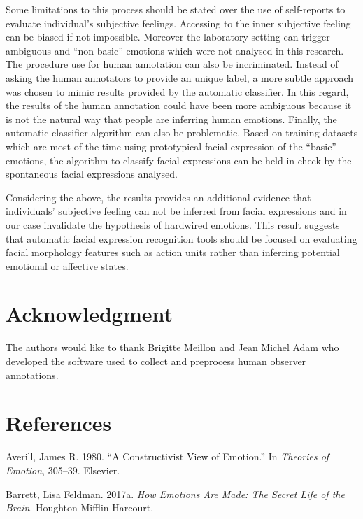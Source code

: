 \documentclass[conference,final,]{IEEEtran}
\begin{document}
Some limitations to this process should be stated over the use of
self-reports to evaluate individual's subjective feelings. Accessing to
the inner subjective feeling can be biased if not impossible. Moreover
the laboratory setting can trigger ambiguous and ``non-basic'' emotions
which were not analysed in this research. The procedure use for human
annotation can also be incriminated. Instead of asking the human
annotators to provide an unique label, a more subtle approach was chosen
to mimic results provided by the automatic classifier. In this regard,
the results of the human annotation could have been more ambiguous
because it is not the natural way that people are inferring human
emotions. Finally, the automatic classifier algorithm can also be
problematic. Based on training datasets which are most of the time using
prototypical facial expression of the ``basic'' emotions, the algorithm
to classify facial expressions can be held in check by the spontaneous
facial expressions analysed.

Considering the above, the results provides an additional evidence that
individuals' subjective feeling can not be inferred from facial
expressions and in our case invalidate the hypothesis of hardwired
emotions. This result suggests that automatic facial expression
recognition tools should be focused on evaluating facial morphology
features such as action units rather than inferring potential emotional
or affective states.

\hypertarget{acknowledgment}{%
\section{Acknowledgment}\label{acknowledgment}}

The authors would like to thank Brigitte Meillon and Jean Michel Adam
who developed the software used to collect and preprocess human observer
annotations.

\hypertarget{references}{%
\section*{References}\label{references}}

\hypertarget{refs}{}
\leavevmode\hypertarget{ref-averill1980constructivist}{}%
Averill, James R. 1980. ``A Constructivist View of Emotion.'' In
\emph{Theories of Emotion}, 305--39. Elsevier.

\leavevmode\hypertarget{ref-barrett2017emotions}{}%
Barrett, Lisa Feldman. 2017a. \emph{How Emotions Are Made: The Secret
Life of the Brain}. Houghton Mifflin Harcourt.
\end{document}
